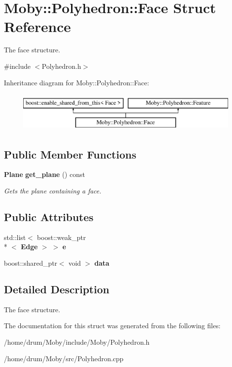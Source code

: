 \section{Moby\-:\-:Polyhedron\-:\-:Face Struct Reference}
\label{structMoby_1_1Polyhedron_1_1Face}


The face structure.  




{\ttfamily \#include $<$Polyhedron.\-h$>$}

Inheritance diagram for Moby\-:\-:Polyhedron\-:\-:Face\-:\begin{figure}[H]
\begin{center}
\leavevmode
\includegraphics[height=2.000000cm]{structMoby_1_1Polyhedron_1_1Face}
\end{center}
\end{figure}
\subsection*{Public Member Functions}
\begin{DoxyCompactItemize}
\item 
{\bf Plane} {\bf get\-\_\-plane} () const \label{structMoby_1_1Polyhedron_1_1Face_a7974184821525910e93b0a4b1a8ad997}

\begin{DoxyCompactList}\small\item\em Gets the plane containing a face. \end{DoxyCompactList}\end{DoxyCompactItemize}
\subsection*{Public Attributes}
\begin{DoxyCompactItemize}
\item 
std\-::list$<$ boost\-::weak\-\_\-ptr\\*
$<$ {\bf Edge} $>$ $>$ {\bfseries e}\label{structMoby_1_1Polyhedron_1_1Face_a2abe4b7edeab1e97b77fd5026971bbd9}

\item 
boost\-::shared\-\_\-ptr$<$ void $>$ {\bfseries data}\label{structMoby_1_1Polyhedron_1_1Face_abbbcf82287e4200c6dc2ab114cb70cde}

\end{DoxyCompactItemize}


\subsection{Detailed Description}
The face structure. 

The documentation for this struct was generated from the following files\-:\begin{DoxyCompactItemize}
\item 
/home/drum/\-Moby/include/\-Moby/Polyhedron.\-h\item 
/home/drum/\-Moby/src/Polyhedron.\-cpp\end{DoxyCompactItemize}
